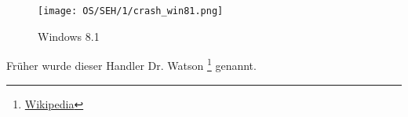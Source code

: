 \begin{figure}[H]
\centering
\texttt{[image: OS/SEH/1/crash\_win81.png]}
\caption{Windows 8.1}
\end{figure}

Früher wurde dieser Handler Dr. Watson
\footnote{\href{http://go.yurichev.com/17046}{Wikipedia}}
genannt.

%
%
%
%
%
%
%
%
%
%
%
